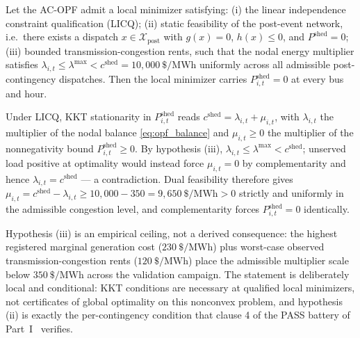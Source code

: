 \begin{proposition}
\label{prop:shed}
Let the AC-OPF admit a local minimizer satisfying: (i) the linear independence constraint qualification (LICQ); (ii) static feasibility of the post-event network, i.e.\ there exists a dispatch $x \in \mathcal{X}_{\mathrm{post}}$ with $g(x) = 0$, $h(x) \le 0$, and $P^{\mathrm{shed}} = 0$; (iii) bounded transmission-congestion rents, such that the nodal energy multiplier satisfies $\lambda_{i,t} \le \lambda^{\max} < c^{\mathrm{shed}} = 10{,}000\ \text{\$}/\mathrm{MWh}$ uniformly across all admissible post-contingency dispatches. Then the local minimizer carries $P_{i,t}^{\mathrm{shed}} = 0$ at every bus and hour.
\end{proposition}

\begin{IEEEproof}
Under LICQ, KKT stationarity in $P_{i,t}^{\mathrm{shed}}$ reads $c^{\mathrm{shed}} = \lambda_{i,t} + \mu_{i,t}$, with $\lambda_{i,t}$ the multiplier of the nodal balance \eqref{eq:opf_balance} and $\mu_{i,t} \ge 0$ the multiplier of the nonnegativity bound $P_{i,t}^{\mathrm{shed}} \ge 0$. By hypothesis (iii), $\lambda_{i,t} \le \lambda^{\max} < c^{\mathrm{shed}}$; unserved load positive at optimality would instead force $\mu_{i,t} = 0$ by complementarity and hence $\lambda_{i,t} = c^{\mathrm{shed}}$ --- a contradiction. Dual feasibility therefore gives $\mu_{i,t} = c^{\mathrm{shed}} - \lambda_{i,t} \ge 10{,}000 - 350 = 9{,}650\ \text{\$}/\mathrm{MWh} > 0$ strictly and uniformly in the admissible congestion level, and complementarity forces $P_{i,t}^{\mathrm{shed}} = 0$ identically.
\end{IEEEproof}

Hypothesis (iii) is an empirical ceiling, not a derived consequence: the highest registered marginal generation cost ($230\ \text{\$}/\mathrm{MWh}$) plus worst-case observed transmission-congestion rents ($120\ \text{\$}/\mathrm{MWh}$) place the admissible multiplier scale below $350\ \text{\$}/\mathrm{MWh}$ across the validation campaign. The statement is deliberately local and conditional: KKT conditions are necessary at qualified local minimizers, not certificates of global optimality on this nonconvex problem, and hypothesis (ii) is exactly the per-contingency condition that clause 4 of the PASS battery of Part~I~\cite{seni142part1} verifies.


